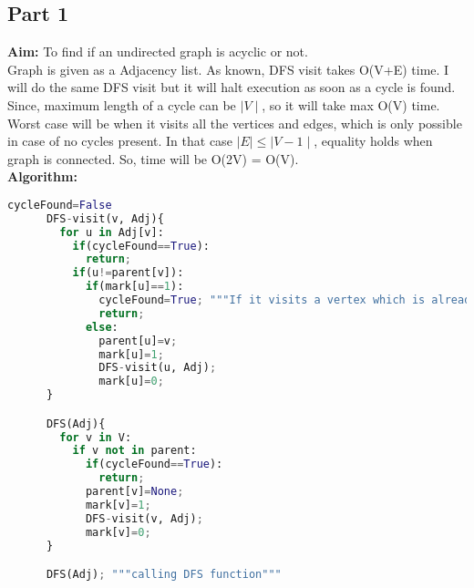 \documentclass{article}
\begin{document}
  \subsection*{Part 1}
    \textbf{Aim:} To find if an undirected graph is acyclic or not.\\
    Graph is given as a Adjacency list. As known, DFS visit takes O(V+E) time.
    I will do the same DFS visit but it will halt execution as soon as a cycle is found.
    Since, maximum length of a cycle can be $\mid V \mid$, so it will take max O(V) time.\\
    Worst case will be when it visits all the vertices and edges, which is only possible in case of no cycles present.
    In that case $\mid E \mid \leq \mid V-1 \mid$, equality holds when graph is connected. So, time will be O(2V) = O(V).\\
    \textbf{Algorithm:}
    \begin{lstlisting}[language=Python]
      cycleFound=False
      DFS-visit(v, Adj){
        for u in Adj[v]:
          if(cycleFound==True):
            return;
          if(u!=parent[v]):
            if(mark[u]==1):
              cycleFound=True; """If it visits a vertex which is already in process, means cycle is found"""
              return;
            else:
              parent[u]=v;
              mark[u]=1;
              DFS-visit(u, Adj);
              mark[u]=0;
      }

      DFS(Adj){
        for v in V:
          if v not in parent:
            if(cycleFound==True):
              return;
            parent[v]=None;
            mark[v]=1;
            DFS-visit(v, Adj);
            mark[v]=0;
      }

      DFS(Adj); """calling DFS function"""
    \end{lstlisting}
\end{document}
